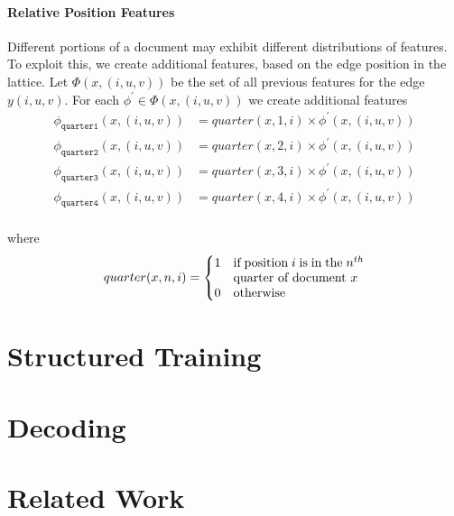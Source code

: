 \documentclass[11pt]{article}
\begin{document}
\paragraph{Relative Position Features}

Different portions of a document may exhibit different distributions of features. To exploit this, we create additional features, based on the edge position in the lattice. 
Let $\Phi(x, (i, u, v))$ be the set of all previous features for the edge $y(i, u, v)$. For each $\phi^\prime \in \Phi(x, (i, u, v))$ we create additional features
\begin{align*}
\phi_{\texttt{quarter1}}(x, (i,u,v)) & = quarter(x,1,i)\times\phi^\prime(x, (i,u,v))\\ 
\phi_{\texttt{quarter2}}(x, (i,u,v)) & = quarter(x,2,i)\times\phi^\prime(x, (i,u,v))\\ 
\phi_{\texttt{quarter3}}(x, (i,u,v)) & = quarter(x,3,i)\times\phi^\prime(x, (i,u,v))\\ 
\phi_{\texttt{quarter4}}(x, (i,u,v)) & = quarter(x,4,i)\times\phi^\prime(x, (i,u,v))\\ 
\end{align*}

where 
\[quarter(x, n, i) = \begin{cases} 1 &\parbox[t]{.3\textwidth}{ if position $i$  is in the $n^{th}$ quarter of document $x$}\\ 0 & \textrm{otherwise}\end{cases}\]




\section{Structured Training}


\section{Decoding}

\section{Related Work}





\end{document}
